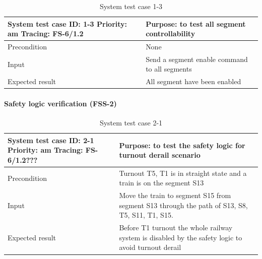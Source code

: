 \begin{table}[H]
	\caption{System test case 1-3}
	\label{table:TCase-FSS1-3}
	\begin{center}
		\renewcommand{\arraystretch}{1.8}
		\begin{tabu} 
			to 0.9 \textwidth
			{  X[0.4, c] X[c] }
			\toprule
			System test case ID: 1-3 \newline Priority: am \newline Tracing: FS-6/1.2 & Purpose: to test all segment controllability  \\ \midrule
			Precondition                                                              & None                                          \\
			Input                                                                     & Send a segment enable command to all segments \\
			Expected result                                                           & All segment have been enabled                 \\ \bottomrule
		\end{tabu}
	\end{center}
\end{table}


\paragraph{Safety logic verification (FSS-2)}
\begin{table}[H]
	\caption{System test case 2-1}
	\label{table:TCase-FSS2-1}
	\begin{center}
		\renewcommand{\arraystretch}{1.8}
		\begin{tabu} 
			to 0.9 \textwidth
			{  X[0.4, c] X[c] }
			\toprule
			System test case ID: 2-1 \newline Priority: am \newline Tracing: FS-6/1.2??? & Purpose: to test the safety logic for turnout derail scenario                                 \\ \midrule
			Precondition                                                                 & Turnout T5, T1 is in straight state and a train is on the segment S13                         \\
			Input                                                                        & Move the train to segment S15 from segment S13 through the path of S13, S8, T5, S11, T1, S15. \\
			Expected result                                                              & Before T1 turnout the whole railway system is disabled by the safety logic to avoid turnout derail                    \\ \bottomrule
		\end{tabu}
	\end{center}
\end{table}

